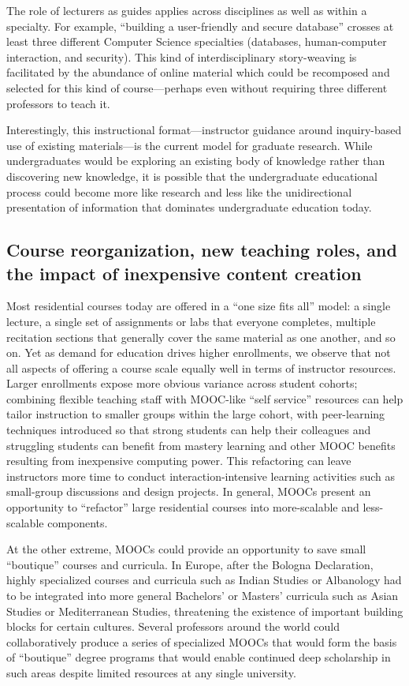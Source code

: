 The role of lecturers as guides applies across disciplines as well as within a specialty.  For example, ``building a user-friendly and secure
database''  crosses at least three different Computer Science specialties
(databases, human-computer interaction, and security). 
This kind of interdisciplinary
story-weaving is facilitated by the abundance of online material which
could be recomposed and selected for this kind of course---perhaps even
without requiring three different professors to teach it.

Interestingly, this instructional format---instructor guidance around
inquiry-based use of existing materials---is the current model for
graduate research.  While undergraduates would be exploring an existing
body of knowledge rather than discovering new knowledge, it is possible
that the undergraduate educational process could become more like
research and less like the unidirectional presentation of information
that dominates undergraduate education today.


\subsection{Course reorganization, new teaching roles,  and the impact of
  inexpensive content creation} 

Most residential courses today are offered in a ``one size fits all''
model: a single lecture, a single set of assignments or labs that
everyone completes, multiple recitation sections that generally cover
the same material as one another, and so on.
Yet as demand for education drives higher enrollments, we observe that
not all aspects of offering a course scale equally well in terms of
instructor resources.
Larger enrollments expose more obvious variance across student cohorts;
combining flexible teaching staff with MOOC-like ``self service''
resources can help tailor instruction to smaller groups within the large
cohort, with peer-learning techniques introduced so that 
strong students can help their colleagues and struggling students can
benefit from mastery learning and other MOOC benefits resulting from
inexpensive computing power.
This refactoring can leave instructors more time to conduct
interaction-intensive learning activities such as small-group 
discussions and design projects.
In general, MOOCs present an opportunity to ``refactor'' large residential
courses into more-scalable and less-scalable components.

At the other extreme, MOOCs could provide an opportunity to save small
``boutique'' courses and curricula.
In Europe, after the Bologna Declaration, highly specialized courses and
curricula such as Indian Studies or Albanology had to be integrated into
more general Bachelors' or Masters' curricula such as Asian Studies or
Mediterranean Studies, threatening the existence of important building
blocks for certain cultures.
Several professors around the world could collaboratively produce a
series of specialized MOOCs that would form the basis of ``boutique''
degree programs that would enable continued deep scholarship in such
areas despite limited resources at any single university.


